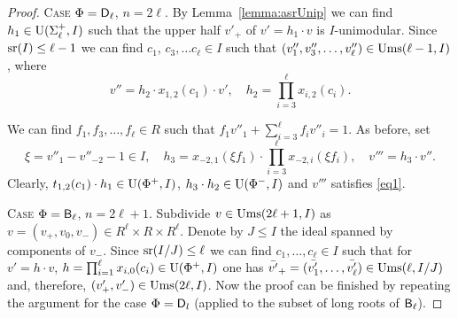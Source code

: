 \begin{proof}
\textsc{Case $\Phi=\mathsf{D}_\ell$, $n= 2\ell$.} 
By Lemma~\ref{lemma:asrUnip} we can find $h_1\in \operatorname{U}(\Sigma^+_\ell, I)$ such that the upper half $v'_+$ of $v'=h_1 \cdot v$ is $I$-unimodular.
Since $\operatorname{sr}(I)\leq \ell-1$ we can find $c_1$, $c_3, \ldots c_\ell \in I$ such that $(v''_1, v''_3, \ldots, v''_\ell) \in \operatorname{Ums}(\ell-1, I)$, where
\[ v''=h_2 \cdot x_{1,2}(c_1) \cdot v', \quad h_2=\prod_{i=3}^\ell x_{i,2}(c_i). \]

We can find $f_1, f_3,\ldots, f_\ell \in R$ such that $f_1v''_1+\sum_{i=3}^\ell f_i v''_{i} = 1$.
As before, set
\[ \xi = v''_1-v''_{-2}-1 \in I, \quad h_3 = x_{-2,1}(\xi f_1) \cdot \prod_{i=3}^\ell x_{-2,i}(\xi f_i), \quad v'''=h_3 \cdot v''. \]
Clearly, $t_{1,2}(c_1) \cdot h_1 \in \operatorname{U}(\Phi^+, I)$, $ h_3 \cdot h_2 \in \operatorname{U}(\Phi^-, I)$ and $v'''$ satisfies \ref{eq1}.

\textsc{Case $\Phi=\mathsf{B}_\ell$, $n=2\ell+1$.} Subdivide $v\in \operatorname{Ums}(2\ell+1, I)$ as $v=(v_+, v_0, v_-)\in R^\ell\times R\times R^\ell$.
Denote by $J\leq I$ the ideal spanned by components of $v_-$.
Since $\operatorname{sr}(I/J)\leq \ell$ we can find $c_1,\dots,c_\ell\in I$ such that for $v' = h \cdot v$, $h = \prod_{i=1}^\ell x_{i,0}(c_i) \in \operatorname{U}(\Phi^+, I)$
one has $\bar{v'}_+=(\bar{v'_1},\ldots, \bar{v'_\ell}) \in \operatorname{Ums}(\ell, I/J)$ and, therefore, $(v'_+, v'_-) \in \operatorname{Ums}(2\ell, I)$.
Now the proof can be finished by repeating the argument for the case $\Phi=\mathsf{D}_l$ (applied to the subset of long roots of $\mathsf{B}_\ell$).
\end{proof}

